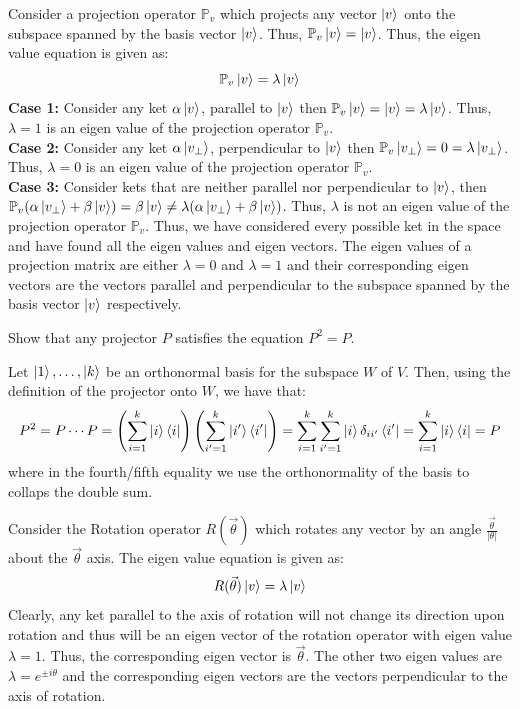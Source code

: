\begin{example}
    Consider a projection operator $\mathbb{P}_v$ which projects any vector $\ket{v}$ onto the subspace spanned by the basis vector $\ket{v}$. Thus, $\mathbb{P}_v\ket{v}=\ket{v}$. Thus, the eigen value equation is given as:
    \[\mathbb{P}_v\ket{v}=\lambda\ket{v}\]
    \textbf{Case 1:} Consider any ket $\alpha \ket{v}$, parallel to $\ket{v}$ then $\mathbb{P}_v\ket{v}=\ket{v}=\lambda\ket{v}$. Thus, $\lambda=1$ is an eigen value of the projection operator $\mathbb{P}_v$.\\
    \textbf{Case 2:} Consider any ket $\alpha \ket{v_{\perp}}$, perpendicular to $\ket{v}$ then $\mathbb{P}_v\ket{v_{\perp}}=0=\lambda\ket{v_{\perp}}$. Thus, $\lambda=0$ is an eigen value of the projection operator $\mathbb{P}_v$.\\
    \textbf{Case 3:} Consider kets that are neither parallel nor perpendicular to $\ket{v}$, then $\mathbb{P}_v(\alpha \ket{v_{\perp}}+\beta \ket{v})=\beta \ket{v} \neq \lambda(\alpha \ket{v_{\perp}} + \beta \ket{v})$. Thus, $\lambda$ is not an eigen value of the projection operator $\mathbb{P}_v$.
    Thus, we have considered every possible ket in the space and have found all the eigen values and eigen vectors. The eigen values of a projection matrix
    are either $\lambda=0$ and $\lambda=1$ and their corresponding eigen vectors are the vectors parallel and perpendicular to the subspace spanned by the basis vector $\ket{v}$ respectively.
\end{example}
\begin{example}
    Show that any projector $P$ satisfies the equation $P^2=P$.

    Let $\ket{1},\ldots,\ket{k}$ be an orthonormal basis for the subspace $W$ of $V$. Then, using the definition of the projector onto $W$, we have that:
    \[
    P^2=P\cdots P=\left(\sum_{i=1}^k \ket{i}\bra{i}\right) \left(\sum_{i'=1}^k \ket{i'}\bra{i'}\right) = \sum_{i=1}^k \sum_{i'=1}^k \ket{i}\delta_{ii'}\bra{i'}=\sum_{i=1}^k \ket{i}\bra{i}=P
    \]
    where in the fourth/fifth equality we use the orthonormality of the basis to collaps the double sum.
\end{example}
\begin{example}
    Consider the Rotation operator $R(\vec{\theta})$ which rotates any vector by an angle $\frac{\vec{\theta}}{|\theta|}$ about the $\vec{\theta}$ axis.
    The eigen value equation is given as:
    \[R(\vec{\theta})\ket{v}=\lambda\ket{v}\]
    Clearly, any ket parallel to the axis of rotation will not change its direction upon rotation and thus will be an eigen vector of the rotation operator with eigen value $\lambda=1$. Thus, 
    the corresponding eigen vector is $\vec{\theta}$. 
    The other two eigen values are $\lambda=e^{\pm i\theta}$ and the corresponding eigen vectors are the vectors perpendicular to the axis of rotation.
\end{example}


